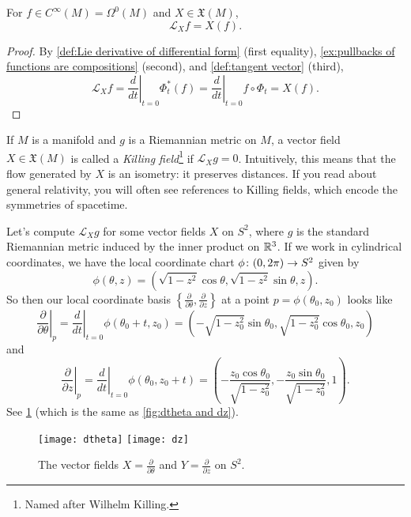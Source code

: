 \begin{lemma}\label{lem:Lie derivative of function}
	For $f \in C^\infty(M) = \Omega^0(M)$ and $X \in \mathfrak{X}(M)$, 
	\[
		\mathcal{L}_Xf = X(f).
	\]
\end{lemma}

\begin{proof}
	By \cref{def:Lie derivative of differential form} (first equality), \cref{ex:pullbacks of functions are compositions} (second), and \cref{def:tangent vector} (third), 
	\[
		\mathcal{L}_Xf = \left. \frac{d}{dt}\right|_{t=0} \Phi_t^\ast(f) = \left. \frac{d}{dt}\right|_{t=0} f \circ \Phi_t = X(f).
	\]
\end{proof}

\begin{example}
	If $M$ is a manifold and $g$ is a Riemannian metric on $M$, a vector field $X \in \mathfrak{X}(M)$ is called a \emph{Killing field}\footnote{Named after Wilhelm Killing.} if $\mathcal{L}_Xg = 0$. Intuitively, this means that the flow generated by $X$ is an isometry: it preserves distances. If you read about general relativity, you will often see references to Killing fields, which encode the symmetries of spacetime.
	
	Let's compute $\mathcal{L}_X g$ for some vector fields $X$ on $S^2$, where $g$ is the standard Riemannian metric induced by the inner product on $\mathbb{R}^3$. If we work in cylindrical coordinates, we have the local coordinate chart $\phi\colon\thinspace\! (0,2\pi) \to S^2$ given by
	\[
		\phi(\theta, z) = \left(\sqrt{1-z^2}\cos \theta, \sqrt{1-z^2} \sin \theta, z\right).
	\]
	So then our local coordinate basis $\left\{\frac{\partial}{\partial \theta}, \frac{\partial}{\partial z} \right\}$ at a point $p = \phi(\theta_0,z_0)$ looks like
	\[
		\left. \frac{\partial}{\partial \theta}\right|_p = \left. \frac{d}{dt} \right|_{t=0} \phi(\theta_0+t,z_0) = \left(-\sqrt{1-z_0^2}\sin\theta_0, \sqrt{1-z_0^2}\cos \theta_0,z_0\right)
	\]
	and
	\[
		\left. \frac{\partial}{\partial z}\right|_p = \left. \frac{d}{dt} \right|_{t=0} \phi(\theta_0,z_0+t) = \left(-\frac{z_0 \cos \theta_0}{\sqrt{1-z_0^2}},-\frac{z_0 \sin \theta_0}{\sqrt{1-z_0^2}},1\right).
	\]
	See \cref{fig:dtheta and dz 2} (which is the same as \cref{fig:dtheta and dz}).
	\begin{figure}[htbp]
		\centering
			\texttt{[image: dtheta]} \qquad \texttt{[image: dz]}
		\caption{The vector fields $X = \frac{\partial}{\partial \theta}$ and $Y = \frac{\partial}{\partial z}$ on $S^2$.}
		\label{fig:dtheta and dz 2}
	\end{figure}
	

\end{example}
